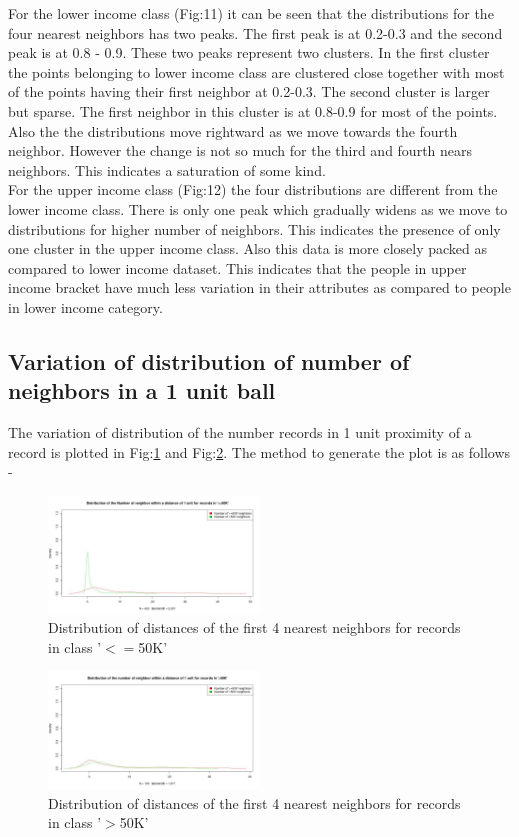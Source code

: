 For the lower income class (Fig:11) it can be seen that the distributions for the four nearest neighbors has two peaks. The first peak is at 0.2-0.3 and the second peak is at 0.8 - 0.9. These two peaks represent two clusters. In the first cluster the points belonging to lower income class are clustered close together with most of the points having their first neighbor at 0.2-0.3. The second cluster is larger but sparse. The first neighbor in this cluster is at 0.8-0.9 for most of the points. Also the the distributions move rightward as we move towards the fourth neighbor. However the change is not so much for the third and fourth nears neighbors. This indicates a saturation of some kind.\\

For the upper income class (Fig:12) the four distributions are different from the lower income class. There is only one peak which gradually widens as we move to distributions for higher number of neighbors. This indicates the presence of only one cluster in the upper income class. Also this data is more closely packed as compared to lower income dataset. This indicates that the people in upper income bracket have much less variation in their attributes as compared to people in lower income category.

\subsection{Variation of distribution of number of neighbors in a 1 unit ball}
The variation of distribution of the number records in 1 unit proximity of a record is plotted in Fig:\ref{fig:numberof-neighbors-class1} and Fig:\ref{fig:numberof-neighbors-class2}. The method to generate the plot is as follows - 

\begin{figure}[h]
		\label{fig:numberof-neighbors-class1}
		\caption{Distribution of distances of the first 4 nearest neighbors for records in class '$<=$50K'}
		\centering
		\includegraphics[width=0.5\textwidth]{images/numberof-neighbors-class1.jpg}
\end{figure}
\begin{figure}[h]
		\label{fig:numberof-neighbors-class2}
		\caption{Distribution of distances of the first 4 nearest neighbors for records in class '$>$50K'}
		\centering
		\includegraphics[width=0.5\textwidth]{images/numberof-neighbors-class2.jpg}
\end{figure}

